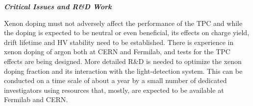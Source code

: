 
{\it\bf Critical Issues and R\&D Work}

Xenon doping must not adversely affect the performance of the TPC and while the doping is expected to be neutral or even beneficial, its effects on charge yield, drift lifetime and HV stability need to be established.  There is experience in xenon doping of argon both at CERN and Fermilab, and tests for the TPC effects are being designed.  
More detailed R\&D is needed to optimize the xenon doping fraction and its interaction with the light-detection system. This can be conducted on a time scale of about a year by a small number of dedicated investigators using resources that, mostly, are expected to be available at Fermilab and CERN. 

